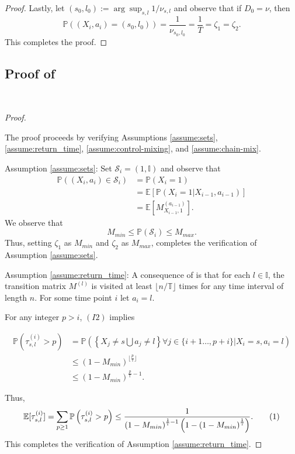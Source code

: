 \documentclass[opre,sglanonrev]{informs4}
\numberwithin{equation}{section}
\newcommand{\pow}[1]{^{(#1)}}
\newcommand{\lp}{\left(}
\newcommand{\rp}{\right)}
\newcommand{\lc}{\left\{}
\newcommand{\rc}{\right\}}
\newcommand{\lb}{\left[}
\newcommand{\rb}{\right]}
\newcommand{\Ibb}{\mathbb{I}}
\newcommand{\Pbb}{\mathbb{P}}
\newcommand{\Tbb}{\mathbb{T}}
\newcommand{\Scal}{\mathcal{S}}
\newcommand\numberthis{\addtocounter{equation}{1}\tag{\theequation}}
\newcommand{\prob}{\Pbb}
\newcommand{\expec}{\mathbb{E}}
\newcommand{\initialD}{D_0}
\begin{document}
\begin{APPENDICES}
\begin{proof}
Lastly, let $(s_0,l_0):=\arg\sup_{s,l} 1/\nu_{s,l}$ and observe that if $\initialD=\nu$, then
\[
\prob\lp(X_i,a_i)=(s_0,l_0)\rp=\frac{1}{\nu_{s_0,l_0}}=\frac{1}{T}=\zeta_1=\zeta_2.
\]
This completes the proof.
\end{proof}
\subsection{Proof of }~\label{prf:inh-mc}
\begin{proof} \

The proof proceeds by verifying Assumptions \ref{assume:sets}, \ref{assume:return_time},  \ref{assume:control-mixing}, and \ref{assume:chain-mix}.

Assumption \ref{assume:sets}: Set $\Scal_i = (1,\Ibb)$ and observe that
\begin{align*}
    \prob\lp(X_i,a_i)\in\Scal_i\rp & = \prob\lp X_i=1\rp\\
    & = \expec\lb  \prob\lp X_i=1|X_{i-1},a_{i-1}\rp \rb\\
    & = \expec[ M_{X_{i-1},1}\pow{a_{i-1}}].
\end{align*}
We observe that
\[
 M_{min}\leq\prob\lp \Scal_i\rp\leq M_{max}.
\]
Thus, setting $\zeta_1$ as $M_{min}$ and $\zeta_2$ as $M_{max}$, completes the verification of Assumption \ref{assume:sets}.

Assumption \ref{assume:return_time}: A consequence of  is that for each $l\in \Ibb$, the transition matrix $M^{(l)}$ is visited at least $\lfloor n/\Tbb \rfloor$ times for any time interval of length $n$. 
For some time point $i$ let $a_i=l$.

For any integer $p>i$, $(I2)$ implies
\begin{small}
\begin{align*}
    \prob\lp \tau_{s,l}\pow{i}>p \rp  & =\prob\lp \lc X_j\neq s\bigcup a_j\neq l \rc \forall j\in\{i+1\dots,p+i\}|X_i=s,a_i=l \rp\\
    & \leq \lp1-M_{min}\rp^{\lfloor\frac{p}{\Tbb}\rfloor}\\
    & \leq \lp1-M_{min}\rp^{\frac{p}{\Tbb}-1}.
\end{align*}
\end{small}
Thus, 
\begin{align*}
    \expec[\tau_{s,l}^{(i)}]=\sum_{p\geq 1}\prob\lp\tau_{s,l}^{(i)}>p\rp\leq \frac{1}{\lp1-M_{min}\rp^{\frac{1}{\Tbb}-1}\lp 1-\lp1-M_{min}\rp^{\frac{1}{\Tbb}}\rp}.\numberthis\label{eq:inhomogenous-eq3}
\end{align*}
This completes the verification of Assumption \ref{assume:return_time}.


\end{proof}
\end{APPENDICES}
\end{document}
